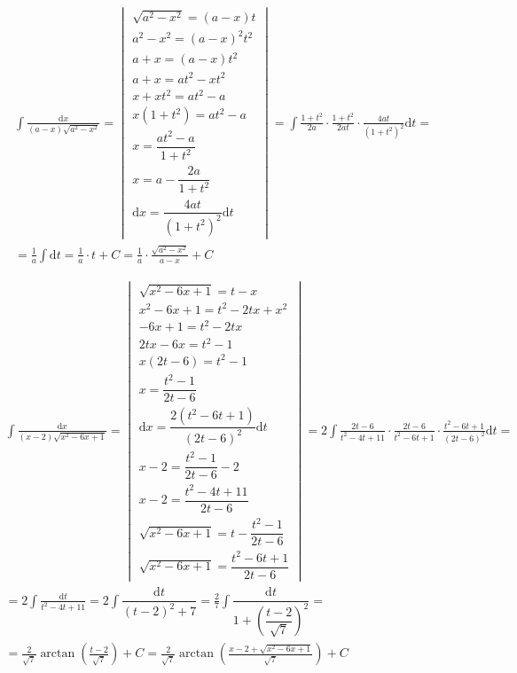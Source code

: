 \begin{gather*}
\int{\frac{\mbox{d}x}{(a-x)\sqrt{a^2-x^2}}} =
\begin{vmatrix}
  \sqrt{a^2-x^2}=(a-x)t\\
  a^2-x^2=(a-x)^2t^2\\
  a+x=(a-x)t^2\\
  a+x=at^2-xt^2\\
  x+xt^2=at^2-a\\
  x(1+t^2)=at^2-a\\
  x=\dfrac{at^2-a}{1+t^2}\\
  x=a-\dfrac{2a}{1+t^2}\\
  \mbox{d}x=\dfrac{4at}{(1+t^2)^2}\mbox{d}t
\end{vmatrix}
= \int{\frac{1+t^2}{2a}\cdot\frac{1+t^2}{2at}\cdot\frac{4at}{(1+t^2)^2}\mbox{d}t} = \\
= \frac{1}{a}\int{\mbox{d}t}
= \frac{1}{a}\cdot t + C
= \frac{1}{a}\cdot \frac{\sqrt{a^2-x^2}}{a-x} + C
\end{gather*}


\begin{gather*}
\int{\frac{\mbox{d}x}{\left(x-2\right)\sqrt{x^2-6x+1}}} =
\begin{vmatrix}
  \sqrt{x^2-6x+1}=t-x\\
  x^2-6x+1=t^2-2tx+x^2\\
  -6x+1=t^2-2tx\\
  2tx-6x=t^2-1\\
  x(2t-6)=t^2-1\\
  x=\dfrac{t^2-1}{2t-6}\\
  \mbox{d}x=\dfrac{2(t^2-6t+1)}{(2t-6)^{2}}\mbox{d}t\\
  x-2=\dfrac{t^2-1}{2t-6}-2 \\
  x-2=\dfrac{t^2-4t+11}{2t-6}\\
  \sqrt{x^2-6x+1} = t-\dfrac{t^2-1}{2t-6} \\
  \sqrt{x^2-6x+1} = \dfrac{t^2-6t+1}{2t-6}
\end{vmatrix}
= 2\int{\frac{2t-6}{t^2-4t+11}\cdot\frac{2t-6}{t^2-6t+1}\cdot\frac{t^2-6t+1}{\left(2t-6\right)^{2}}\mbox{d}t} = \\
= 2\int{\frac{\mbox{d}t}{t^2-4t+11}}
= 2\int{\dfrac{\mbox{d}t}{\left(t-2\right)^2+7}}
= \frac{2}{7}\int{\dfrac{\mbox{d}t}{1+\left(\dfrac{t-2}{\sqrt{7}}\right)^2}} = \\
= \frac{2}{\sqrt{7}}\arctan{\left(\frac{t-2}{\sqrt{7}}\right)}+C
= \frac{2}{\sqrt{7}}\arctan{\left(\frac{x-2+\sqrt{x^2-6x+1}}{\sqrt{7}}\right)}+C
\end{gather*}


